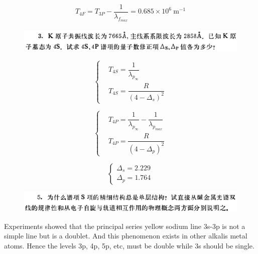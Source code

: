 \documentclass{article}
\begin{document}
\begin{equation*}
  \begin{aligned}
    T_{4F} = T_{3P} - \dfrac{1}{\lambda_{f_{max}}} = 0.685 \times 10^6 \  \mathrm{m^{-1}} 
  \end{aligned}
\end{equation*}

\begin{figure}[H]
  \centering
  \includegraphics[width=\linewidth]{figures/3}
  \label{fig:}
\end{figure}

\begin{equation*}
  \left\{
  \begin{aligned}
    & T_{4S} = \dfrac{1}{\lambda_{p_{\infty}}} \\
    & T_{4S} = \dfrac{R}{\left( 4 - \Delta_s \right)^2} 
  \end{aligned}
  \right.
\end{equation*}

\begin{equation*}
  \left\{
  \begin{aligned}
    & T_{4P} = \dfrac{1}{\lambda_{p_{\infty}}} - \dfrac{1}{\lambda_{p_{max}}}  \\
    & T_{4P} = \dfrac{R}{\left( 4 - \Delta_p \right)^2} 
  \end{aligned}
  \right.
\end{equation*}

\begin{equation*}
  \left\{
  \begin{aligned}
    \Delta_s = 2.229 \\
    \Delta_p = 1.764
  \end{aligned}
  \right.
\end{equation*}

\begin{figure}[H]
  \centering
  \includegraphics[width=\linewidth]{figures/5}
  \label{fig:}
\end{figure}

Experiments showed that the principal series yellow sodium line 3s-3p is not a simple line but is a doublet. And this phenomenon exists in other alkalis metal atoms. Hence the levels 3p, 4p, 5p, etc, must be double while 3s should be single.
\end{document}
